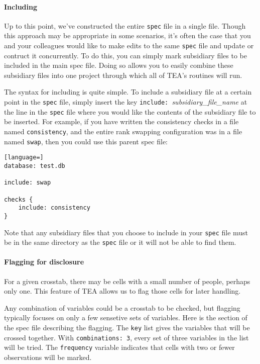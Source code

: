 \documentclass{article}
\begin{document}
\paragraph{Including} Up to this point, we've constructed the entire {\tt spec} file in a single file. 
Though this approach may 
be appropriate in some scenarios, it's often the case that you and your colleagues would like to make 
edits to the same {\tt spec} file and update or contruct it concurrently. To do this, you can simply mark 
subsidiary files to be included in the main spec file. Doing so allows you to easily combine these 
subsidiary files into one project through which all of TEA's routines will run.

The syntax for including is quite simple. To include a subsidiary file at a certain point in the {\tt spec} 
file, simply insert the key {\tt include: }\textit{subsidiary\_file\_name} at the line in the {\tt spec} 
file where you would like the contents of the subsidiary file to be inserted. For example, if you have 
written the consistency checks in a file named {\tt consistency}, and the entire rank swapping 
configuration was in a file named {\tt swap}, then you could use this parent spec file:

\begin{lstlisting}[language=]
database: test.db

include: swap

checks {
    include: consistency
}
\end{lstlisting}

Note that any subsidiary files that you choose to include in your {\tt spec} file must be in the same 
directory as the {\tt spec} file or it will not be able to find them.

\paragraph{Flagging for disclosure} For a given crosstab, there may be cells with a small number of 
people, perhaps only one. This feature of TEA allows us to flag those cells for later handling.

Any combination of variables could be a crosstab to be checked, but flagging
typically focuses on only a few sensetive sets of variables. Here is the section
of the spec file describing the flagging. The {\tt key} list gives the variables
that will be crossed together. With {\tt combinations: 3}, every set of three
variables in the list will be tried. The {\tt frequency} variable indicates that
cells with two or fewer observations will be marked.
\end{document}
